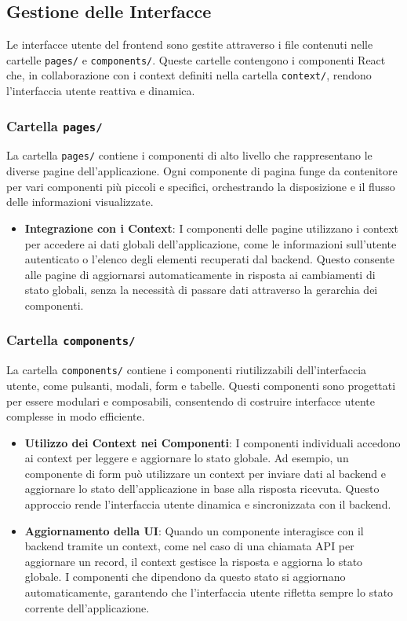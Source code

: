 \documentclass[twoside]{supsistudent}
\begin{document}
\subsection{Gestione delle Interfacce}
Le interfacce utente del frontend sono gestite attraverso i file contenuti nelle cartelle \texttt{pages/} e \texttt{components/}. Queste cartelle contengono i componenti React che, in collaborazione con i context definiti nella cartella \texttt{context/}, rendono l'interfaccia utente reattiva e dinamica.

\subsubsection{Cartella \texttt{pages/}}
La cartella \texttt{pages/} contiene i componenti di alto livello che rappresentano le diverse pagine dell'applicazione. Ogni componente di pagina funge da contenitore per vari componenti più piccoli e specifici, orchestrando la disposizione e il flusso delle informazioni visualizzate.

\begin{itemize}
  \item \textbf{Integrazione con i Context}: I componenti delle pagine utilizzano i context per accedere ai dati globali dell'applicazione, come le informazioni sull'utente autenticato o l'elenco degli elementi recuperati dal backend. Questo consente alle pagine di aggiornarsi automaticamente in risposta ai cambiamenti di stato globali, senza la necessità di passare dati attraverso la gerarchia dei componenti.
\end{itemize}

\subsubsection{Cartella \texttt{components/}}
La cartella \texttt{components/} contiene i componenti riutilizzabili dell'interfaccia utente, come pulsanti, modali, form e tabelle. Questi componenti sono progettati per essere modulari e composabili, consentendo di costruire interfacce utente complesse in modo efficiente.

\begin{itemize}
  \item \textbf{Utilizzo dei Context nei Componenti}: I componenti individuali accedono ai context per leggere e aggiornare lo stato globale. Ad esempio, un componente di form può utilizzare un context per inviare dati al backend e aggiornare lo stato dell'applicazione in base alla risposta ricevuta. Questo approccio rende l'interfaccia utente dinamica e sincronizzata con il backend.
  \item \textbf{Aggiornamento della UI}: Quando un componente interagisce con il backend tramite un context, come nel caso di una chiamata API per aggiornare un record, il context gestisce la risposta e aggiorna lo stato globale. I componenti che dipendono da questo stato si aggiornano automaticamente, garantendo che l'interfaccia utente rifletta sempre lo stato corrente dell'applicazione.
\end{itemize}
\end{document}
